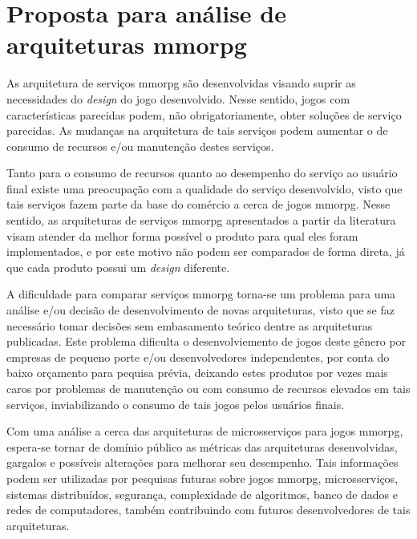 \chapter{Proposta para análise de arquiteturas \ac{mmorpg}}
\label{cap3}

As arquitetura de serviços \ac{mmorpg} são desenvolvidas visando suprir as necessidades do \textit{design} do jogo desenvolvido.
%
Nesse sentido, jogos com características parecidas podem, não obrigatoriamente, obter soluções de serviço parecidas.
%
As mudanças na arquitetura de tais serviços podem aumentar o de consumo de recursos e/ou manutenção destes serviços.


Tanto para o consumo de recursos quanto ao desempenho do serviço ao usuário final existe uma preocupação com a qualidade do serviço desenvolvido, visto que tais serviços fazem parte da base do comércio a cerca de jogos \ac{mmorpg}.
%
Nesse sentido, as arquiteturas de serviços \ac{mmorpg} apresentados a partir da literatura visam atender da melhor forma possível o produto para qual eles foram implementados, e por este motivo não podem ser comparados de forma direta, já que cada produto possui um \textit{design} diferente.


A dificuldade para comparar serviços \ac{mmorpg} torna-se um problema para uma análise e/ou decisão de desenvolvimento de novas arquiteturas, visto que se faz necessário tomar decisões sem embasamento teórico dentre as arquiteturas publicadas.
%
Este problema dificulta o desenvolviemento de jogos deste gênero por empresas de pequeno porte e/ou desenvolvedores independentes, por conta do baixo orçamento para pequisa prévia, deixando estes produtos por vezes mais caros por problemas de manutenção ou com consumo de recursos elevados em tais serviços, inviabilizando o consumo de tais jogos pelos usuários finais.



Com uma análise a cerca das arquiteturas de microsserviços para jogos \ac{mmorpg}, espera-se tornar de domínio público as métricas das arquiteturas desenvolvidas, gargalos e possíveis alterações para melhorar seu desempenho.
%
Tais informações podem ser utilizadas por pesquisas futuras sobre jogos \ac{mmorpg}, microsserviços, sistemas distribuídos, segurança, complexidade de algoritmos, banco de dados e redes de computadores, também contribuindo com futuros desenvolvedores de tais arquiteturas.




